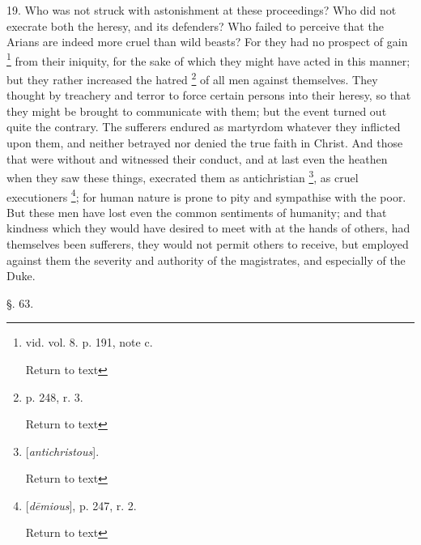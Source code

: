 19. Who was not struck with astonishment at these
proceedings? Who did not execrate both the heresy, and its defenders?
Who failed to perceive that the Arians are indeed more cruel than wild
beasts? For they had no prospect of gain \footnote{vid.
vol. 8. p. 191, note c.

Return to text} from their
iniquity, for the sake of which they might have acted in this manner;
but they rather increased the hatred \footnote{p. 248, r. 3.

Return to text} of all men against
themselves. They thought by treachery and terror to force certain
persons into their heresy, so that they might be brought to
communicate with them; but the event turned out quite the contrary.
The sufferers endured as martyrdom whatever they inflicted upon them,
and neither betrayed nor denied the true faith in Christ. And those
that were without and witnessed their conduct, and at last even the
heathen when they saw these things, execrated them as antichristian \footnote{[\emph{antichristous}].

Return to text}, as cruel executioners \footnote{[\emph{d\={e}mious}], p. 247, r. 2.

Return to text}; for human nature is prone
to pity and sympathise with the poor. But these men have lost even the
common sentiments of humanity; and that kindness which they
would have desired to meet with at the hands of others, had themselves
been sufferers, they would not permit others to receive, but employed
against them the severity and authority of the magistrates, and
especially of the Duke.

§. 63.

